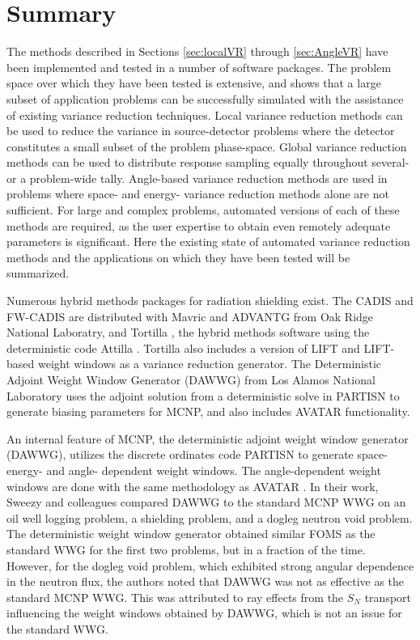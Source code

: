 \section{Summary}
\label{sec:litsummary}

The methods described in Sections \ref{sec:localVR} through \ref{sec:AngleVR}
have been implemented and tested in a number of software packages. The problem
space over which they have been tested is extensive, and shows that a large
subset of application problems can be successfully simulated with the assistance
of existing variance reduction techniques. Local variance reduction methods can
be used to reduce the variance in source-detector problems where the detector
constitutes a small subset of the problem phase-space. Global variance reduction
methods can be used to distribute response sampling equally throughout several-
or a problem-wide tally. Angle-based variance reduction methods are used in
problems where space- and energy- variance reduction methods alone are not
sufficient. For large and complex problems, automated versions of each of these
methods are required, as the user expertise to obtain even remotely adequate
parameters is significant. Here the existing state of automated variance
reduction methods and the applications on which they have been tested will be
summarized.

Numerous hybrid methods packages for radiation shielding exist.
The CADIS and FW-CADIS are distributed with Mavric \cite{SCALE6_1,
peplow_advanced_2007} and
ADVANTG \cite{mosher_automated_2009} from Oak Ridge National Laboratry, and Tortilla
\cite{somasundaram_implementation_2013},
the hybrid methods software using the deterministic code Attilla
\cite{lucas_applications_2004}. Tortilla also includes a version of LIFT and
LIFT-based weight windows as a variance reduction generator.
The Deterministic Adjoint Weight Window
Generator (DAWWG) from Los Alamos National Laboratory
\cite{sweezy_automated_2005} uses the adjoint solution
from a deterministic solve in
PARTISN \cite{alcouffe_partisn_2002}
to generate biasing parameters for MCNP, and also includes AVATAR
functionality.

An internal feature of MCNP, the deterministic adjoint weight window generator
(DAWWG), utilizes the discrete ordinates code PARTISN
\cite{sweezy_automated_2005} to generate space- energy- and angle- dependent
weight windows. The angle-dependent weight windows are done with the same
methodology as AVATAR \cite{sweezy_automated_2005, van_riper_generation_1995}.
In their work, Sweezy and colleagues compared
DAWWG to the standard MCNP WWG on an oil well logging problem, a shielding
problem, and a dogleg neutron void problem. The deterministic weight window
generator obtained similar FOMS as the standard WWG for the first two problems,
but in a fraction of the time. However, for the dogleg void problem, which
exhibited strong angular dependence in the neutron flux,
the authors noted that DAWWG was not as effective as the
standard MCNP WWG. This was attributed to ray effects from the $S_N$ transport
influencing the weight windows obtained by DAWWG, which is not an issue for the
standard WWG.

